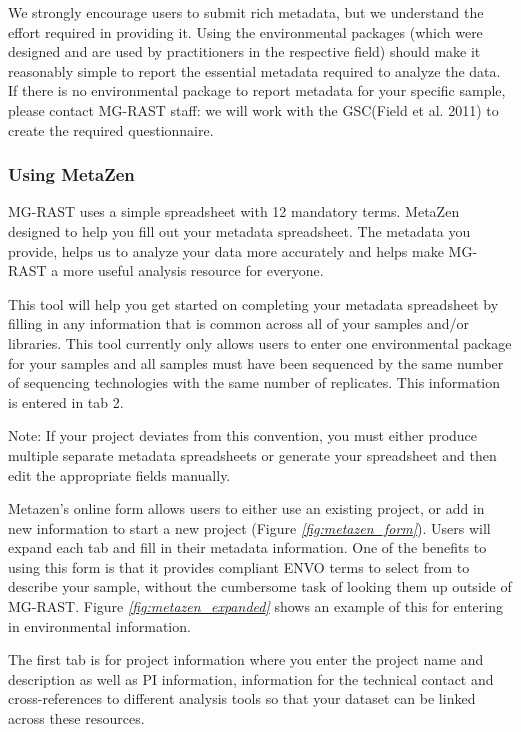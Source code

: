 \documentclass[letterpaper,10pt,english]{sphinxmanual}
\begin{document}
We strongly encourage users to submit rich metadata, but we understand
the effort required in providing it. Using the environmental packages
(which were designed and are used by practitioners in the respective
field) should make it reasonably simple to report the essential metadata
required to analyze the data. If there is no environmental package to
report metadata for your specific sample, please contact MG-RAST staff:
we will work with the GSC(Field et al. 2011) to create the required
questionnaire.


\subsubsection{Using MetaZen}
\label{\detokenize{user_manual:using-metazen}}\label{\detokenize{user_manual:section-using-metazen}}
MG-RAST uses a simple spreadsheet with 12 mandatory terms. MetaZen
designed to help you fill out your metadata spreadsheet. The metadata
you provide, helps us to analyze your data more accurately and helps
make MG-RAST a more useful analysis resource for everyone.

This tool will help you get started on completing your metadata
spreadsheet by filling in any information that is common across all of
your samples and/or libraries. This tool currently only allows users to
enter one environmental package for your samples and all samples must
have been sequenced by the same number of sequencing technologies with
the same number of replicates. This information is entered in tab 2.

Note: If your project deviates from this convention, you must either
produce multiple separate metadata spreadsheets or generate your
spreadsheet and then edit the appropriate fields manually.

Metazen’s online form allows users to either use an existing project, or
add in new information to start a new project (Figure
{\hyperref[\detokenize{user_manual:fig:metazen_form}]{\emph{{[}fig:metazen\_form{]}}}}). Users will expand each tab
and fill in their metadata information. One of the benefits to using
this form is that it provides compliant ENVO terms to select from to
describe your sample, without the cumbersome task of looking them up
outside of MG-RAST. Figure
{\hyperref[\detokenize{user_manual:fig:metazen_expanded}]{\emph{{[}fig:metazen\_expanded{]}}}} shows an example of
this for entering in environmental information.

The first tab is for project information where you enter the project
name and description as well as PI information, information for the
technical contact and cross-references to different analysis tools so
that your dataset can be linked across these resources.
\end{document}
